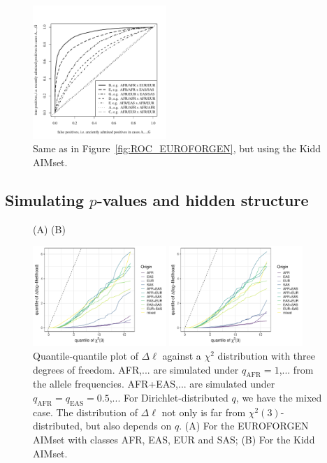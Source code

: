 \documentclass[12pt]{article}
\theoremstyle{definition}
\begin{document}
\begin{figure}[H]
  \begin{center}
    \includegraphics[width=0.45\textwidth]{roc-curve-Kidd.pdf}
  \end{center}
  \caption{Same as in Figure~\ref{fig:ROC_EUROFORGEN}, but using the
    Kidd AIMset.}
  \label{fig:ROC_Kidd} 
\end{figure}

\subsection{Simulating $p$-values and hidden structure}

\begin{figure}[htb]
  \hspace{3cm} (A) \hspace{7cm} (B)
  \begin{center}
    \parbox[b]{0.45\textwidth}{\includegraphics[width=0.45\textwidth]{qvalues_EUROFORGEN_1ksim_H0.pdf}}    \parbox[b]{0.45\textwidth}{\includegraphics[width=0.45\textwidth]{qvalues_Kidd_1ksim_H0.pdf}}
  \end{center}
  \caption{\label{fig:qvalues} Quantile-quantile plot of $\Delta\ell$ against a $\chi^2$ distribution with three degrees of freedom. AFR,... are simulated under $q_{\text{AFR}}=1$,... from the allele frequencies. AFR+EAS,... are simulated under $q_{\text{AFR}}=q_{\text{EAS}}=0.5$,... For Dirichlet-distributed $q$, we have the mixed case. The distribution of $\Delta\ell$ not only is far from $\chi^2(3)$-distributed, but also depends on $q$. (A) For the EUROFORGEN AIMset with classes AFR, EAS, EUR and SAS; (B) For the Kidd AIMset.}
\end{figure}
\end{document}
